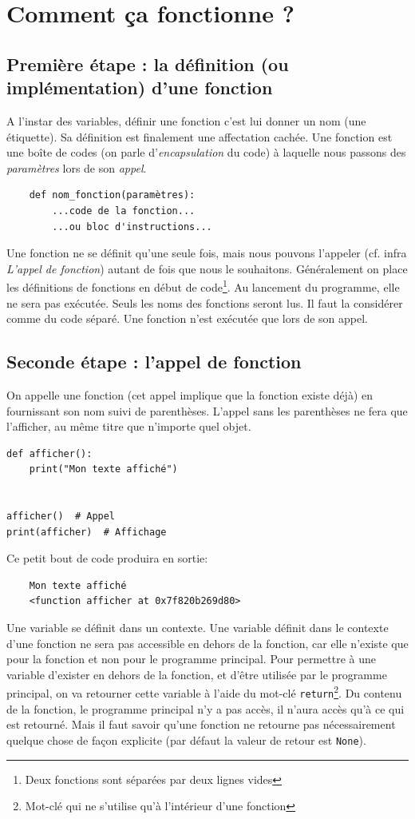 \documentclass[a4paper,12pt]{book}
\begin{document}
\section{Comment ça fonctionne ?}
\subsection*{Première étape : la définition (ou implémentation) d'une fonction}
A l'instar des variables, définir une fonction c'est lui donner un nom (une étiquette). Sa définition est finalement une affectation cachée. Une fonction est une boîte de codes (on parle d'\textit{encapsulation} du code) à laquelle nous passons des \textit{paramètres} lors de son \textit{appel}.
\begin{verbatim}
    def nom_fonction(paramètres):
        ...code de la fonction...
        ...ou bloc d'instructions...
\end{verbatim}
\medskip

Une fonction ne se définit qu'une seule fois, mais nous pouvons l'appeler (cf. infra \textit{L'appel de fonction}) autant de fois que nous le souhaitons. Généralement on place les définitions de fonctions en début de code\footnote{Deux fonctions sont séparées par deux lignes vides}. Au lancement du programme, elle ne sera pas exécutée. Seuls les noms des fonctions seront lus. Il faut la considérer comme du code séparé. Une fonction n'est exécutée que lors de son appel.

\subsection*{Seconde étape : l'appel de fonction}
On appelle une fonction (cet appel implique que la fonction existe déjà) en fournissant son nom suivi de parenthèses. L'appel sans les parenthèses ne fera que l'afficher, au même titre que n'importe quel objet.
\medskip

\begin{lstlisting}[caption=Utiliser une fonction]
def afficher():
    print("Mon texte affiché")


afficher()  # Appel
print(afficher)  # Affichage
\end{lstlisting}
\medskip

Ce petit bout de code produira en sortie:
\begin{verbatim}
    Mon texte affiché
    <function afficher at 0x7f820b269d80>
\end{verbatim}
\medskip

Une variable se définit dans un contexte. Une variable définit dans le contexte d'une fonction ne sera pas accessible en dehors de la fonction, car elle n'existe que pour la fonction et non pour le programme principal. Pour permettre à une variable d'exister en dehors de la fonction, et d'être utilisée par le programme principal, on va retourner cette variable à l'aide du mot-clé \texttt{return}\footnote{Mot-clé qui ne s'utilise qu'à l'intérieur d'une fonction}. Du contenu de la fonction, le programme principal n'y a pas accès, il n'aura accès qu'à ce qui est retourné. Mais il faut savoir qu'une fonction ne retourne pas nécessairement quelque chose de façon explicite (par défaut la valeur de retour est \texttt{None}).
\medskip
\end{document}
